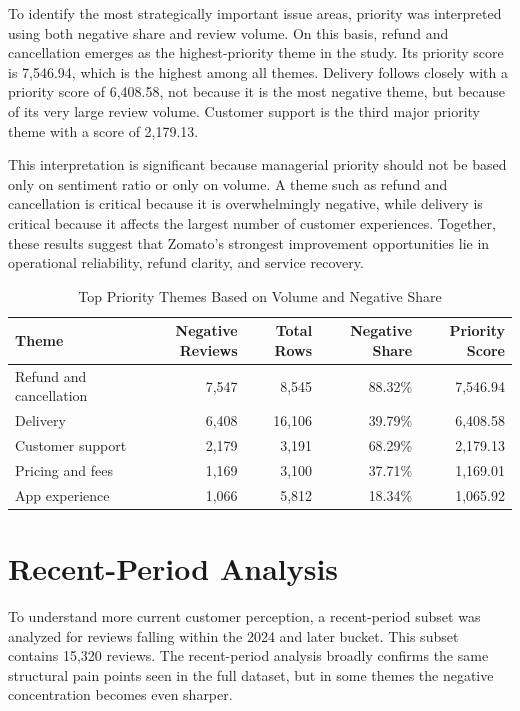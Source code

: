 To identify the most strategically important issue areas, priority was interpreted using both negative share and review volume. On this basis, refund and cancellation emerges as the highest-priority theme in the study. Its priority score is 7,546.94, which is the highest among all themes. Delivery follows closely with a priority score of 6,408.58, not because it is the most negative theme, but because of its very large review volume. Customer support is the third major priority theme with a score of 2,179.13.

This interpretation is significant because managerial priority should not be based only on sentiment ratio or only on volume. A theme such as refund and cancellation is critical because it is overwhelmingly negative, while delivery is critical because it affects the largest number of customer experiences. Together, these results suggest that Zomato's strongest improvement opportunities lie in operational reliability, refund clarity, and service recovery.


\begin{table}[h]
\centering
\caption{Top Priority Themes Based on Volume and Negative Share}
\begin{tabular}{lrrrr}
\toprule
\textbf{Theme} & \textbf{Negative Reviews} & \textbf{Total Rows} & \textbf{Negative Share} & \textbf{Priority Score} \\
\midrule
Refund and cancellation & 7,547 & 8,545 & 88.32\% & 7,546.94 \\
Delivery & 6,408 & 16,106 & 39.79\% & 6,408.58 \\
Customer support & 2,179 & 3,191 & 68.29\% & 2,179.13 \\
Pricing and fees & 1,169 & 3,100 & 37.71\% & 1,169.01 \\
App experience & 1,066 & 5,812 & 18.34\% & 1,065.92 \\
\bottomrule
\end{tabular}
\end{table}

\section{Recent-Period Analysis}

To understand more current customer perception, a recent-period subset was analyzed for reviews falling within the 2024 and later bucket. This subset contains 15,320 reviews. The recent-period analysis broadly confirms the same structural pain points seen in the full dataset, but in some themes the negative concentration becomes even sharper.

